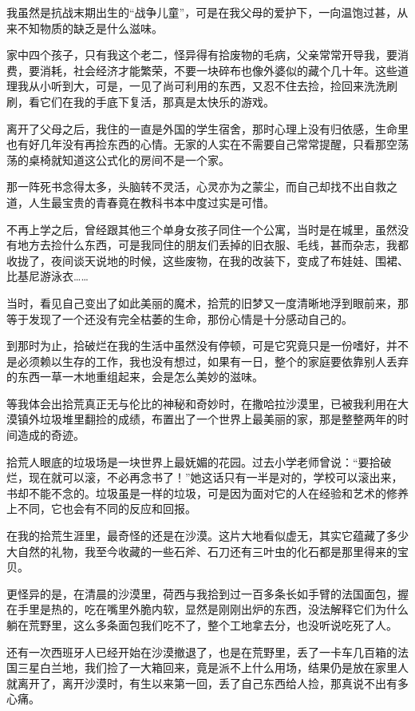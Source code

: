 \par 我虽然是抗战末期出生的“战争儿童”，可是在我父母的爱护下，一向温饱过甚，从来不知物质的缺乏是什么滋味。
\par 家中四个孩子，只有我这个老二，怪异得有拾废物的毛病，父亲常常开导我，要消费，要消耗，社会经济才能繁荣，不要一块碎布也像外婆似的藏个几十年。这些道理我从小听到大，可是，一见了尚可利用的东西，又忍不住去捡，捡回来洗洗刷刷，看它们在我的手底下复活，那真是太快乐的游戏。
\par 离开了父母之后，我住的一直是外国的学生宿舍，那时心理上没有归依感，生命里也有好几年没有再捡东西的心情。无家的人实在不需要自己常常提醒，只看那空荡荡的桌椅就知道这公式化的房间不是一个家。
\par 那一阵死书念得太多，头脑转不灵活，心灵亦为之蒙尘，而自己却找不出自救之道，人生最宝贵的青春竟在教科书本中度过实是可惜。
\par 不再上学之后，曾经跟其他三个单身女孩子同住一个公寓，当时是在城里，虽然没有地方去捡什么东西，可是我同住的朋友们丢掉的旧衣服、毛线，甚而杂志，我都收拢了，夜间谈天说地的时候，这些废物，在我的改装下，变成了布娃娃、围裙、比基尼游泳衣……
\par 当时，看见自己变出了如此美丽的魔术，拾荒的旧梦又一度清晰地浮到眼前来，那等于发现了一个还没有完全枯萎的生命，那份心情是十分感动自己的。
\par 到那时为止，拾破烂在我的生活中虽然没有停顿，可是它究竟只是一份嗜好，并不是必须赖以生存的工作，我也没有想过，如果有一日，整个的家庭要依靠别人丢弃的东西一草一木地重组起来，会是怎么美妙的滋味。
\par 等我体会出拾荒真正无与伦比的神秘和奇妙时，在撒哈拉沙漠里，已被我利用在大漠镇外垃圾堆里翻捡的成绩，布置出了一个世界上最美丽的家，那是整整两年的时间造成的奇迹。
\par 拾荒人眼底的垃圾场是一块世界上最妩媚的花园。过去小学老师曾说：“要拾破烂，现在就可以滚，不必再念书了！”她这话只有一半是对的，学校可以滚出来，书却不能不念的。垃圾虽是一样的垃圾，可是因为面对它的人在经验和艺术的修养上不同，它也会有不同的反应和回报。
\par 在我的拾荒生涯里，最奇怪的还是在沙漠。这片大地看似虚无，其实它蕴藏了多少大自然的礼物，我至今收藏的一些石斧、石刀还有三叶虫的化石都是那里得来的宝贝。
\par 更怪异的是，在清晨的沙漠里，荷西与我拾到过一百多条长如手臂的法国面包，握在手里是热的，吃在嘴里外脆内软，显然是刚刚出炉的东西，没法解释它们为什么躺在荒野里，这么多条面包我们吃不了，整个工地拿去分，也没听说吃死了人。
\par 还有一次西班牙人已经开始在沙漠撤退了，也是在荒野里，丢了一卡车几百箱的法国三星白兰地，我们捡了一大箱回来，竟是派不上什么用场，结果仍是放在家里人就离开了，离开沙漠时，有生以来第一回，丢了自己东西给人捡，那真说不出有多心痛。
